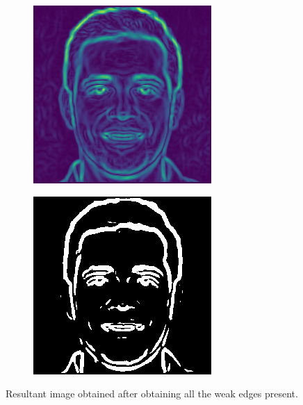 \documentclass{70_styles/svproc}
\begin{document}
\begin{figure}
     \centering
     \begin{subfigure}[b]{0.2\textwidth}
         \centering
         \includegraphics[width=\textwidth]{70_figures/nondd-seed1830.png}
     \end{subfigure}
     \begin{subfigure}[b]{0.2\textwidth}
         \centering
         \includegraphics[width=\textwidth]{70_figures/wem-seed1830.png}
     \end{subfigure}
     \caption{Resultant image obtained after obtaining all the weak edges present.}
\end{figure}
\end{document}
